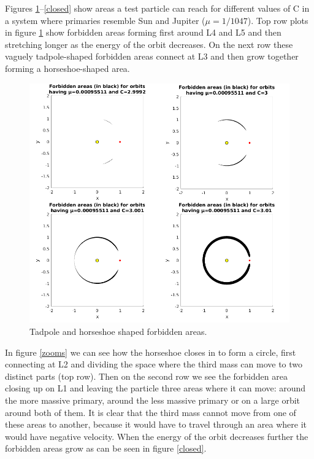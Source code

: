 \documentclass[12pt,a4paper,titlepage]{article}
\begin{document}
Figures \ref{open}--\ref{closed} show areas a test particle can reach for different values of C in a system where primaries resemble Sun and Jupiter ($\mu = 1/1047$). Top row plots in figure \ref{open} show forbidden areas forming first around L4 and L5 and then stretching longer as the energy of the orbit decreases. On the next row these vaguely tadpole-shaped forbidden areas connect at L3 and then grow together forming a horseshoe-shaped area.

\begin{figure}
\centering
\includegraphics[width=\textwidth]{../plots/allowed/open.png}
\caption{Tadpole and horseshoe shaped forbidden areas.}
\label{open}
\end{figure}

In figure \ref{zooms} we can see how the horseshoe closes in to form a circle, first connecting at L2 and dividing the space where the third mass can move to two distinct parts (top row). Then on the second row we see the forbidden area closing up on L1 and leaving the particle three areas where it can move: around the more massive primary, around the less massive primary or on a large orbit around both of them. It is clear that the third mass cannot move from one of these areas to another, because it would have to travel through an area where it would have negative velocity. When the energy of the orbit decreases further the forbidden areas grow as can be seen in figure \ref{closed}.
\end{document}

